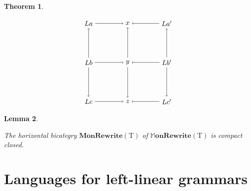 \documentclass{amsart}
\newcommand{\MMonRewrite}{\bicat{MonRewrite}}
\newcommand{\MMMonRewrite}{\dblcat{M}\bicat{onRewrite}}
\newcommand{\cat}[1]{\mathrm{#1}}
\newcommand{\bicat}[1]{\mathbf{#1}}
\newcommand{\dblcat}[1]{\mathbb{#1}}
\newtheorem{theorem}{Theorem}[section]
\newtheorem{lemma}[theorem]{Lemma}
\theoremstyle{remark}
\theoremstyle{definition}
\begin{document}
\begin{theorem}
\begin{itemize}
    \[
      \begin{tikzpicture}
        \begin{scope}
        \node (1) at (0,4) {\( La  \)};
        \node (2) at (2,4) {\( x \)};
        \node (3) at (4,4) {\( La' \)};
        \node (4) at (0,2) {\( Lb \)};
        \node (5) at (2,2) {\( y \)};
        \node (6) at (4,2) {\( Lb' \)};
        \node (7) at (0,0) {\( Lc \)};
        \node (8) at (2,0) {\( z \)};
        \node (9) at (4,0) {\( Lc' \)};
        \draw [->] (1) to node [] {\scriptsize{\(  \)}} (2);
        \draw [->] (3) to node [] {\scriptsize{\(  \)}} (2);
        \draw [->] (4) to node [] {\scriptsize{\(  \)}} (5);
        \draw [->] (6) to node [] {\scriptsize{\(  \)}} (5);
        \draw [->] (7) to node [] {\scriptsize{\(  \)}} (8);
        \draw [->] (9) to node [] {\scriptsize{\(  \)}} (8);
        \draw [->] (4) to node [] {\scriptsize{\(  \)}} (1);
        \draw [->] (4) to node [] {\scriptsize{\(  \)}} (7);
        \draw [->] (5) to node [] {\scriptsize{\(  \)}} (2);
        \draw [->] (5) to node [] {\scriptsize{\(  \)}} (8);
        \draw [->] (6) to node [] {\scriptsize{\(  \)}} (3);
        \draw [->] (6) to node [] {\scriptsize{\(  \)}} (9);
        \end{scope}
      \end{tikzpicture}
    \]

  \end{itemize}
  
\end{theorem}

\begin{lemma} \label{thm:horbicat-MMonRewrite}

  The horizontal bicategry $ \MMonRewrite ( \cat{T} ) $ of
  $ \MMMonRewrite ( \cat{T} ) $ is compact closed.
  
\end{lemma}


\section{Languages for left-linear grammars}
\label{sec:lang-left-linear-grammars}
\end{document}
